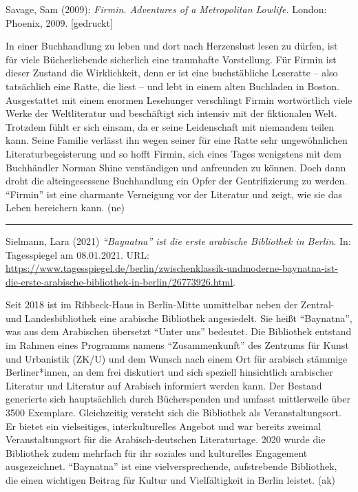 \documentclass[a4paper,
fontsize=11pt,
oneside,
numbers=noperiodatend,
parskip=half-,
bibliography=totoc,
final
]{scrartcl}
\begin{document}
Savage, Sam (2009): \emph{Firmin. Adventures of a Metropolitan Lowlife.}
London: Phoenix, 2009. {[}gedruckt{]}

In einer Buchhandlung zu leben und dort nach Herzenslust lesen zu
dürfen, ist für viele Bücherliebende sicherlich eine traumhafte
Vorstellung. Für Firmin ist dieser Zustand die Wirklichkeit, denn er ist
eine buchstäbliche Leseratte -- also tatsächlich eine Ratte, die liest
-- und lebt in einem alten Buchladen in Boston. Ausgestattet mit einem
enormen Lesehunger verschlingt Firmin wortwörtlich viele Werke der
Weltliteratur und beschäftigt sich intensiv mit der fiktionalen Welt.
Trotzdem fühlt er sich einsam, da er seine Leidenschaft mit niemandem
teilen kann. Seine Familie verlässt ihn wegen seiner für eine Ratte sehr
ungewöhnlichen Literaturbegeisterung und so hofft Firmin, sich eines
Tages wenigstens mit dem Buchhändler Norman Shine verständigen und
anfreunden zu können. Doch dann droht die alteingesessene Buchhandlung
ein Opfer der Gentrifizierung zu werden. \enquote{Firmin} ist eine
charmante Verneigung vor der Literatur und zeigt, wie sie das Leben
bereichern kann. (ne)

\begin{center}\rule{0.5\linewidth}{0.5pt}\end{center}

Sielmann, Lara (2021) \emph{\enquote{Baynatna} ist die erste arabische
Bibliothek in Berlin}. In: Tagesspiegel am 08.01.2021. URL:
\url{https://www.tagesspiegel.de/berlin/zwischenklassik-undmoderne-baynatna-ist-die-erste-arabische-bibliothek-in-berlin/26773926.html}.

Seit 2018 ist im Ribbeck-Haus in Berlin-Mitte unmittelbar neben der
Zentral- und Landesbibliothek eine arabische Bibliothek angesiedelt. Sie
heißt \enquote{Baynatna}, was aus dem Arabischen übersetzt
\enquote{Unter uns} bedeutet. Die Bibliothek entstand im Rahmen eines
Programms namens \enquote{Zusammenkunft} des Zentrums für Kunst und
Urbanistik (ZK/U) und dem Wunsch nach einem Ort für arabisch stämmige
Berliner*innen, an dem frei diskutiert und sich speziell hinsichtlich
arabischer Literatur und Literatur auf Arabisch informiert werden kann.
Der Bestand generierte sich hauptsächlich durch Bücherspenden und
umfasst mittlerweile über 3500 Exemplare. Gleichzeitig versteht sich die
Bibliothek als Veranstaltungsort. Er bietet ein vielseitiges,
interkulturelles Angebot und war bereits zweimal Veranstaltungsort für
die Arabisch-deutschen Literaturtage. 2020 wurde die Bibliothek zudem
mehrfach für ihr soziales und kulturelles Engagement ausgezeichnet.
\enquote{Baynatna} ist eine vielversprechende, aufstrebende Bibliothek,
die einen wichtigen Beitrag für Kultur und Vielfältigkeit in Berlin
leistet. (ak)
\end{document}
